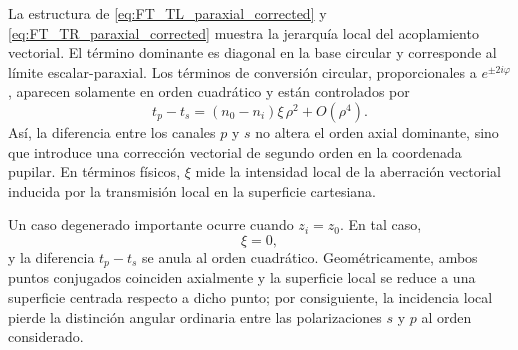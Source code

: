 La estructura de \eqref{eq:FT_TL_paraxial_corrected} y \eqref{eq:FT_TR_paraxial_corrected} muestra la jerarquía local del acoplamiento vectorial. El término dominante es diagonal en la base circular y corresponde al límite escalar-paraxial. Los términos de conversión circular, proporcionales a \(e^{\pm2i\varphi}\), aparecen solamente en orden cuadrático y están controlados por
\begin{equation}
t_p-t_s
=
(n_0-n_i)\xi\,\rho^2
+
O(\rho^4).
\label{eq:polarization_conversion_quadratic_order}
\end{equation}
Así, la diferencia entre los canales \(p\) y \(s\) no altera el orden axial dominante, sino que introduce una corrección vectorial de segundo orden en la coordenada pupilar. En términos físicos, \(\xi\) mide la intensidad local de la aberración vectorial inducida por la transmisión local en la superficie cartesiana.

Un caso degenerado importante ocurre cuando \(z_i=z_0\). En tal caso,
\begin{equation}
\xi=0,
\label{eq:xi_zero_equal_conjugates}
\end{equation}
y la diferencia \(t_p-t_s\) se anula al orden cuadrático. Geométricamente, ambos puntos conjugados coinciden axialmente y la superficie local se reduce a una superficie centrada respecto a dicho punto; por consiguiente, la incidencia local pierde la distinción angular ordinaria entre las polarizaciones \(s\) y \(p\) al orden considerado.
